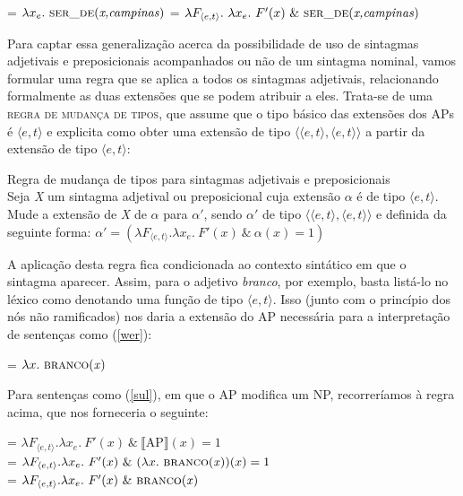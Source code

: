 \begin{exe}
	\ex
	\begin{xlist}
		\ex {} = $\lambda x_{e}.\ \predica{ser\_de}{x,campinas}$ 
		\ex {} = $\lambda F_{\langle e,t\rangle}.\ \lambda x_{e}.\ F'(x)\ \&\ \predica{ser\_de}{x,campinas}$
	\end{xlist}
\end{exe}

\n Para captar essa generalização acerca da possibilidade de uso
de sintagmas adjetivais e preposicionais acompanhados ou não de um sintagma
nominal, vamos formular uma regra que se aplica a todos os
sintagmas adjetivais, relacionando formalmente as duas extensões
que se podem atribuir a eles. Trata-se de uma \textsc{regra de
mudança de tipos}, que assume que o tipo básico das extensões dos
APs é $\langle e,t\rangle$ e explicita como obter uma extensão de
tipo $\langle\langle e,t\rangle,\langle e,t\rangle\rangle$ a
partir da extensão de tipo $\langle e,t\rangle$:

\begin{exe}
	\ex Regra de mudança de tipos para sintagmas adjetivais e preposicionais \\
	Seja \textit{X} um sintagma adjetival ou preposicional cuja extensão $\alpha$ é de tipo $\langle e,t\rangle$. Mude a extensão de \textit{X} de $\alpha$ para $\alpha '$, sendo $\alpha '$ de tipo $\langle\langle e,t\rangle,\langle e,t\rangle\rangle$ e definida da seguinte forma: $\alpha ' = (\lambda F_{\langle e,t\rangle}.\lambda x_{e}.\ F'(x)\ \&\ \alpha(x) = 1)$
\end{exe}



\n A aplicação desta regra fica condicionada ao contexto sintático em que o sintagma aparecer. Assim, para o
adjetivo \textit{branco}, por exemplo, basta listá-lo no léxico
como denotando uma função de tipo $\langle e,t\rangle$. Isso
(junto com o princípio dos nós não ramificados) nos daria a
extensão do AP necessária para a interpretação de
sentenças como (\ref{wer}):

\begin{exe}
	\ex {} = $\lambda x.\ \predica{branco}{x}$
\end{exe}

\n Para sentenças como (\ref{sul}), em que o AP modifica um NP,
recorreríamos à regra acima, que nos forneceria o seguinte:

\begin{exe}
	\ex {} = $\lambda F_{\langle e,t\rangle}.\lambda x_{e}.\ F'(x)\ \&\ \llbracket \text{AP} \rrbracket (x) = 1$\\
	 = $\lambda F_{\langle e,t\rangle}.\lambda x_{e}.\ F'(x)\ \&\ (\lambda x.\ \text{\textsc{branco}(\textit{x})})(x) = 1$\\
	 = $\lambda F_{\langle e,t\rangle}.\lambda x_{e}.\ F'(x)\ \&\ \text{\textsc{branco}(\textit{x})}$
\end{exe}

